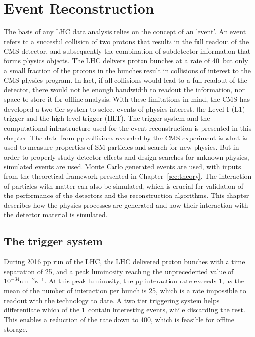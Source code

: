 \chapter{Event Reconstruction}
\noindent\justify
The basis of any LHC data analysis relies on the concept of an 'event'. 
An event refers to a succesful collision of two protons that results in the full readout of the CMS detector, and subsequently the combination of subdetector information that forms physics objects. 
The LHC delivers proton bunches at a rate of 40\MHz\ but only a small fraction of the protons in the bunches result in collisions of interest to the CMS physics program.
In fact, if all collisions would lead to a full readout of the detector, there would not be enough bandwidth to readout the information, nor space to store it for offline analysis. 
With these limitations in mind, the CMS has developed a two-tier system to select events of physics interest, the Level 1 (L1) trigger and the high level trigger (HLT). 
\newpara
\noindent\justify
The trigger system and the computational infrastructure used for the event reconstruction is presented in this chapter. 
The data from pp collisions recorded by the CMS experiment is what is used to measure properties of SM particles and search for new physics. 
But in order to properly study detector effects and design searches for unknown physics, simulated events are used.  
Monte Carlo generated events are used, with inputs from the theoretical framework presented in Chapter~\ref{sec:theory}.
The interaction of particles with matter can also be simulated, which is crucial for validation of the performance of the detectors and the reconstruction algorithms.
This chapter describes how the physics processes are generated and how their interaction with the detector material is simulated.                                               
\newpage
\section{The trigger system}\label{trigger}
\noindent
\justify
During 2016 pp run of the LHC, the LHC delivered proton bunches with a time separation of 25\ns, and a peak luminosity reaching the unprecedented value of $10^{-34}\mathrm{cm}^{-2}\mathrm{s}^{-1}$. 
At this peak luminosity, the pp interaction rate exceeds 1\GHz, as the mean of the number of interaction per bunch is 25, which is a rate impossible to readout with the technology to date.   
A two tier triggering system helps differentiate which of the 1\GHz\ contain interesting events, while discarding the rest. 
This enables a reduction of the rate down to 400\Hz, which is feasible for offline storage.   
